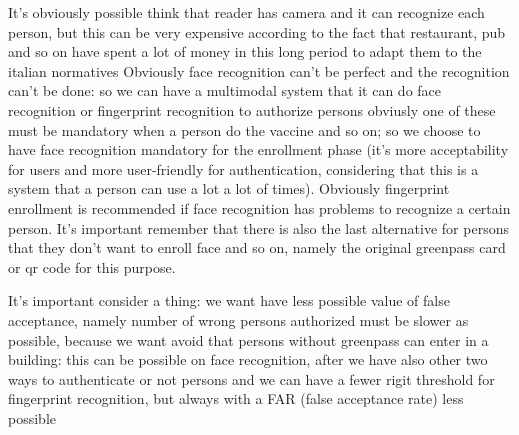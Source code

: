 \documentclass[12pt]{article}
\begin{document}
It's obviously possible think that reader has camera and it can recognize each person, but this can be very expensive according to the fact that restaurant, pub and so on have spent a lot of money in this long period to adapt them to the italian normatives
Obviously face recognition can't be perfect and the recognition can't be done: so we can have a multimodal system that it can do face recognition or fingerprint recognition to authorize persons
obviusly one of these must be mandatory when a person do the vaccine and so on; so we choose to have face recognition mandatory for the enrollment phase (it's more acceptability for users and more user-friendly for authentication, considering that this is a system that a person can use a lot a lot of times). Obviously fingerprint enrollment is recommended if face recognition has problems to recognize a certain person. It's important remember that there is also the last alternative for persons that they don't want to enroll face and so on, namely the original greenpass card or qr code for this purpose.

It's important consider a thing: we want have less possible value of false acceptance, namely number of wrong persons authorized must be slower as possible, because we want avoid that persons without greenpass can enter in a building: this can be possible on face recognition, after we have also other two ways to authenticate or not persons and we can have a fewer rigit threshold for fingerprint recognition, but always with a FAR (false acceptance rate) less possible
\end{document}
